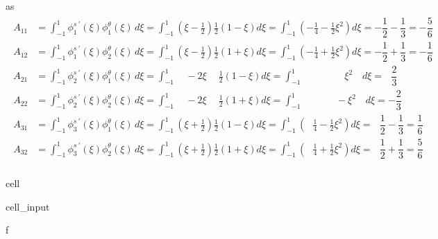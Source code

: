 \documentclass[letterpaper,10pt,english]{jupyterBook}
\begin{document}
\sphinxAtStartPar
as
\begin{equation*}
\begin{split}\begin{aligned}
  A_{11} & = \int_{-1}^{1} \phi^{s \ '}_1(\xi) \phi^{\theta}_1(\xi) \, d \xi
  = \int_{-1}^{1} \left( \xi - \frac{1}{2} \right) \frac{1}{2} \left( 1 - \xi \right) d \xi
  = \int_{-1}^{1} \left( -\frac{1}{4} - \frac{1}{2} \xi^2 \right) d \xi = - \dfrac{1}{2} - \dfrac{1}{3} = - \dfrac{5}{6} \\
    A_{12} & = \int_{-1}^{1} \phi^{s \ '}_1(\xi) \phi^{\theta}_2(\xi) \, d \xi
  = \int_{-1}^{1} \left( \xi - \frac{1}{2} \right) \frac{1}{2} \left( 1 + \xi \right) d \xi
  = \int_{-1}^{1} \left( -\frac{1}{4} + \frac{1}{2} \xi^2 \right) d \xi = - \dfrac{1}{2} + \dfrac{1}{3} = - \dfrac{1}{6} \\
    A_{21} & = \int_{-1}^{1} \phi^{s \ '}_2(\xi) \phi^{\theta}_1(\xi) \, d \xi
  = \int_{-1}^{1} \quad - 2 \xi \quad \ \frac{1}{2} \left( 1 - \xi \right) d \xi
  = \int_{-1}^{1} \qquad \quad \ \ \ \ \ \ \xi^2 \quad d \xi = \ \ \ \dfrac{2}{3} \\
    A_{22} & = \int_{-1}^{1} \phi^{s \ '}_2(\xi) \phi^{\theta}_2(\xi) \, d \xi
  = \int_{-1}^{1} \quad - 2 \xi \quad \ \frac{1}{2} \left( 1 + \xi \right) d \xi
  = \int_{-1}^{1} \qquad \quad \ \ - \xi^2 \quad d \xi = - \dfrac{2}{3} \\
    A_{31} & = \int_{-1}^{1} \phi^{s \ '}_3(\xi) \phi^{\theta}_1(\xi) \, d \xi
  = \int_{-1}^{1} \left( \xi + \frac{1}{2} \right) \frac{1}{2} \left( 1 - \xi \right) d \xi
  = \int_{-1}^{1} \left( \ \ \ \frac{1}{4} - \frac{1}{2} \xi^2 \right) d \xi = \ \ \ \dfrac{1}{2} - \dfrac{1}{3} = \dfrac{1}{6} \\
    A_{32} & = \int_{-1}^{1} \phi^{s \ '}_3(\xi) \phi^{\theta}_2(\xi) \, d \xi
  = \int_{-1}^{1} \left( \xi + \frac{1}{2} \right) \frac{1}{2} \left( 1 + \xi \right) d \xi
  = \int_{-1}^{1} \left( \ \ \ \frac{1}{4} + \frac{1}{2} \xi^2 \right) d \xi = \ \ \ \dfrac{1}{2} + \dfrac{1}{3} = \dfrac{5}{6} \\
\end{aligned}\end{split}
\end{equation*}
\begin{sphinxuseclass}{cell}\begin{sphinxVerbatimInput}

\begin{sphinxuseclass}{cell_input}
\begin{sphinxVerbatim}[commandchars=\\\{\}]
 \PYGZhy{}f
\end{sphinxVerbatim}

\end{sphinxuseclass}\end{sphinxVerbatimInput}

\end{sphinxuseclass}
\end{document}
